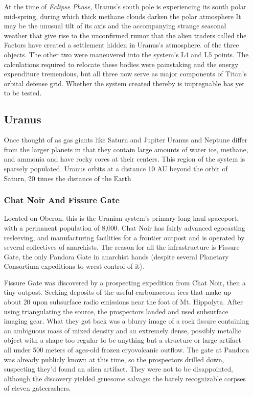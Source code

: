 At the time of \textit{Eclipse Phase,} Uranus's south pole 
is experiencing its south polar mid-spring, during 
which thick methane clouds darken the polar atmosphere
It may be the unusual tilt of its axis and the
accompanying strange seasonal weather that give 
rise to the unconfirmed rumor that the alien traders 
called the Factors have created a settlement hidden 
in Uranus's atmosphere.
of the three objects. The other two 
were maneuvered into the system's L4
and L5 points. The calculations required
to relocate these bodies were painstaking
and the energy expenditure tremendous,
but all three now serve as major components of
Titan's orbital defense grid. Whether the system created
thereby is impregnable has yet to be tested.

\subsection{Uranus}

Once thought of as gas giants like Saturn and Jupiter
Uranus and Neptune differ from the larger
planets in that they contain large amounts of water 
ice, methane, and ammonia and have rocky cores at 
their centers. This region of the system is sparsely
populated. Uranus orbits at a distance 10 AU beyond 
the orbit of Saturn, 20 times the distance of the Earth

\subsubsection{Chat Noir And Fissure Gate}

Located on Oberon, this is the Uranian system's primary
long haul spaceport, with a permanent population
of 8,000. Chat Noir has fairly advanced egocasting
resleeving, and manufacturing facilities for a
frontier outpost and is operated by several collectives 
of anarchists. The reason for all the infrastructure 
is Fissure Gate, the only Pandora Gate in anarchist 
hands (despite several Planetary Consortium expeditions
to wrest control of it).

Fissure Gate was discovered by a prospecting expedition
from Chat Noir, then a tiny outpost. Seeking
deposits of the useful carbonaceous ices that make up 
about 20%
upon subsurface radio emissions near the foot of Mt. 
Hippolyta. After using triangulating the source, the 
prospectors landed and used subsurface imaging gear. 
What they got back was a blurry image of a rock fissure
containing an ambiguous mass of mixed density
and an extremely dense, possibly metallic object with 
a shape too regular to be anything but a structure 
or large artifact—all under 500 meters of ages-old 
frozen cryovolcanic outflow. The gate at Pandora was 
already publicly known at this time, so the prospectors
drilled down, suspecting they'd found an alien
artifact. They were not to be disappointed, although 
the discovery yielded gruesome salvage: the barely 
recognizable corpses of eleven gatecrashers.


